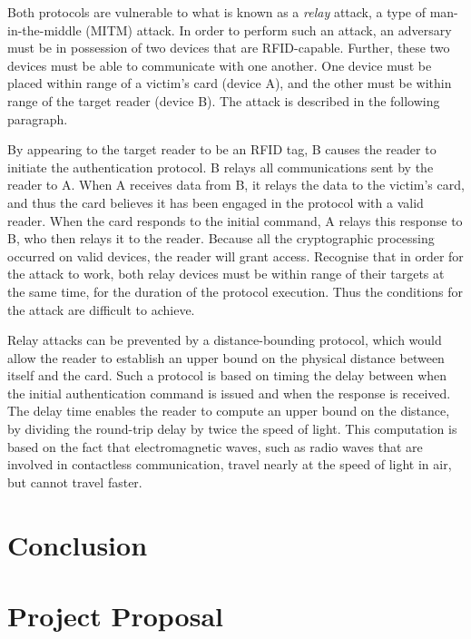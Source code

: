 \documentclass[12pt,a4paper,twoside,openright]{report}
\begin{document}
Both protocols are vulnerable to what is known as a \emph{relay} attack, a type of man-in-the-middle (MITM) attack. In order to perform such an attack, an adversary must be in possession of two devices that are RFID-capable. Further, these two devices must be able to communicate with one another. One device must be placed within range of a victim's card (device A), and the other must be within range of the target reader (device B). The attack is described in the following paragraph.

By appearing to the target reader to be an RFID tag, B causes the reader to initiate the authentication protocol. B relays all communications sent by the reader to A. When A receives data from B, it relays the data to the victim's card, and thus the card believes it has been engaged in the protocol with a valid reader. When the card responds to the initial command, A relays this response to B, who then relays it to the reader. Because all the cryptographic processing occurred on valid devices, the reader will grant access. Recognise that in order for the attack to work, both relay devices must be within range of their targets at the same time, for the duration of the protocol execution. Thus the conditions for the attack are difficult to achieve.

Relay attacks can be prevented by a distance-bounding protocol, which would allow the reader to establish an upper bound on the physical distance between itself and the card. Such a protocol is based on timing the delay between when the initial authentication command is issued and when the response is received. The delay time enables the reader to compute an upper bound on the distance, by dividing the round-trip delay by twice the speed of light. This computation is based on the fact that electromagnetic waves, such as radio waves that are involved in contactless communication, travel nearly at the speed of light in air, but cannot travel faster. 

\chapter{Conclusion}




\appendix

\chapter{Project Proposal}
\label{appendix:proposal}
\end{document}
